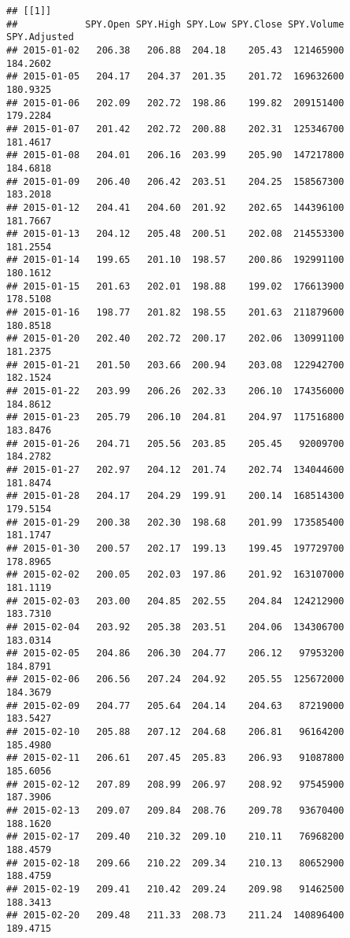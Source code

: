 \documentclass[
]{article}
\begin{document}
\begin{verbatim}
## [[1]]
##            SPY.Open SPY.High SPY.Low SPY.Close SPY.Volume SPY.Adjusted
## 2015-01-02   206.38   206.88  204.18    205.43  121465900     184.2602
## 2015-01-05   204.17   204.37  201.35    201.72  169632600     180.9325
## 2015-01-06   202.09   202.72  198.86    199.82  209151400     179.2284
## 2015-01-07   201.42   202.72  200.88    202.31  125346700     181.4617
## 2015-01-08   204.01   206.16  203.99    205.90  147217800     184.6818
## 2015-01-09   206.40   206.42  203.51    204.25  158567300     183.2018
## 2015-01-12   204.41   204.60  201.92    202.65  144396100     181.7667
## 2015-01-13   204.12   205.48  200.51    202.08  214553300     181.2554
## 2015-01-14   199.65   201.10  198.57    200.86  192991100     180.1612
## 2015-01-15   201.63   202.01  198.88    199.02  176613900     178.5108
## 2015-01-16   198.77   201.82  198.55    201.63  211879600     180.8518
## 2015-01-20   202.40   202.72  200.17    202.06  130991100     181.2375
## 2015-01-21   201.50   203.66  200.94    203.08  122942700     182.1524
## 2015-01-22   203.99   206.26  202.33    206.10  174356000     184.8612
## 2015-01-23   205.79   206.10  204.81    204.97  117516800     183.8476
## 2015-01-26   204.71   205.56  203.85    205.45   92009700     184.2782
## 2015-01-27   202.97   204.12  201.74    202.74  134044600     181.8474
## 2015-01-28   204.17   204.29  199.91    200.14  168514300     179.5154
## 2015-01-29   200.38   202.30  198.68    201.99  173585400     181.1747
## 2015-01-30   200.57   202.17  199.13    199.45  197729700     178.8965
## 2015-02-02   200.05   202.03  197.86    201.92  163107000     181.1119
## 2015-02-03   203.00   204.85  202.55    204.84  124212900     183.7310
## 2015-02-04   203.92   205.38  203.51    204.06  134306700     183.0314
## 2015-02-05   204.86   206.30  204.77    206.12   97953200     184.8791
## 2015-02-06   206.56   207.24  204.92    205.55  125672000     184.3679
## 2015-02-09   204.77   205.64  204.14    204.63   87219000     183.5427
## 2015-02-10   205.88   207.12  204.68    206.81   96164200     185.4980
## 2015-02-11   206.61   207.45  205.83    206.93   91087800     185.6056
## 2015-02-12   207.89   208.99  206.97    208.92   97545900     187.3906
## 2015-02-13   209.07   209.84  208.76    209.78   93670400     188.1620
## 2015-02-17   209.40   210.32  209.10    210.11   76968200     188.4579
## 2015-02-18   209.66   210.22  209.34    210.13   80652900     188.4759
## 2015-02-19   209.41   210.42  209.24    209.98   91462500     188.3413
## 2015-02-20   209.48   211.33  208.73    211.24  140896400     189.4715

\end{verbatim}
\end{document}
